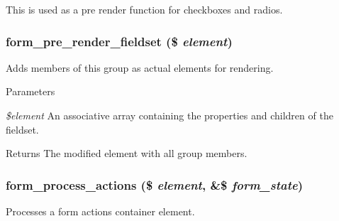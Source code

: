 This is used as a pre render function for checkboxes and radios. \hypertarget{group__form__api_ga10c77d235a5451895a3d2862b1ff4e34}{
\subsubsection[{form\_\-pre\_\-render\_\-fieldset}]{\setlength{\rightskip}{0pt plus 5cm}form\_\-pre\_\-render\_\-fieldset (\$ {\em element})}}
\label{group__form__api_ga10c77d235a5451895a3d2862b1ff4e34}
Adds members of this group as actual elements for rendering.


\begin{DoxyParams}{Parameters}
\item[{\em \$element}]An associative array containing the properties and children of the fieldset.\end{DoxyParams}
\begin{DoxyReturn}{Returns}
The modified element with all group members. 
\end{DoxyReturn}
\hypertarget{group__form__api_ga32dae38034437282e774ecf9436fcdaa}{
\subsubsection[{form\_\-process\_\-actions}]{\setlength{\rightskip}{0pt plus 5cm}form\_\-process\_\-actions (\$ {\em element}, \/  \&\$ {\em form\_\-state})}}
\label{group__form__api_ga32dae38034437282e774ecf9436fcdaa}
Processes a form actions container element.



